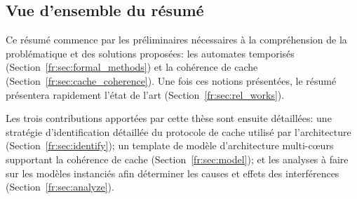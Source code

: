 \subsection{Vue d'ensemble du r\'esum\'e}
Ce résumé  commence par les préliminaires nécessaires à la
compréhension de la problématique et des solutions proposées: les automates
temporis\'es (Section~\ref{fr:sec:formal_methods}) et la cohérence de cache
(Section~\ref{fr:sec:cache_coherence}). Une fois ces notions 
présentées, le résumé présentera rapidement l'état de l'art (Section~\ref{fr:sec:rel_works}).

Les trois contributions apportées
par cette thèse sont ensuite détaillées: une stratégie d'identification détaillée du protocole de cache
utilisé par l'architecture 
(Section~\ref{fr:sec:identify}); un template de modèle d'architecture
multi-c\oe{}urs supportant la cohérence de cache (Section~\ref{fr:sec:model});
et les analyses à faire sur les modèles instanciés afin déterminer les causes
et effets des interférences (Section~\ref{fr:sec:analyze}).
